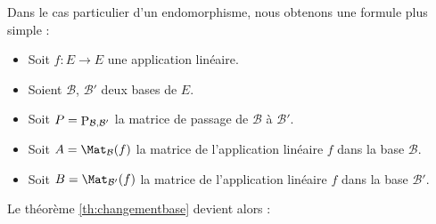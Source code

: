 \documentclass[class=report,crop=false]{standalone}
\begin{document}
Dans le cas particulier d'un endomorphisme, nous obtenons une formule plus simple :
\begin{itemize}

  \item Soit $f : E \to E$ une application linéaire.

  \item Soient $\mathcal{B}$, $\mathcal{B}'$ deux bases de $E$.

  \item Soit $P = \mathop{\mathrm{P}}\nolimits_{\mathcal{B},\mathcal{B}'}$ la matrice de passage de $\mathcal{B}$
  à $\mathcal{B}'$.

  \item Soit $A = \Mat_{\mathcal{B}} (f)$ la matrice de l'application linéaire $f$ dans la base
  $\mathcal{B}$.

  \item Soit $B = \Mat_{\mathcal{B}'} (f)$ la matrice de l'application linéaire $f$ dans
  la base $\mathcal{B}'$.
\end{itemize}

Le théorème \ref{th:changementbase} devient alors :
\begin{corollaire}
\label{cor:changementbase}
\sauteligne
{}
\end{corollaire}
\end{document}
